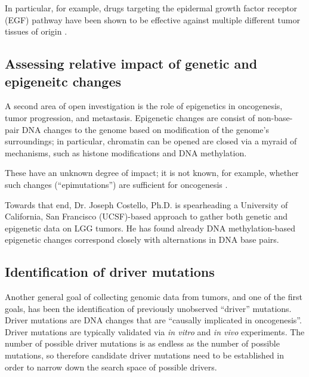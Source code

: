         In particular, for  example, drugs targeting the epidermal growth factor receptor
        (EGF) pathway have been shown to be effective against multiple
        different tumor tissues of origin
        \cite{barretina_cancer_2012}.


        \subsection{Assessing relative impact of genetic and
          epigeneitc changes}

        A second area of open investigation is the role of epigenetics
        in oncogenesis, tumor progression, and
        metastasis. Epigenetic changes are consist of non-base-pair
        DNA changes to the genome based on modification of the
        genome's surroundings; in particular, chromatin can be opened
        are closed via a myraid of mechanisms, such as histone
       modifications and DNA methylation\cite{kouzarides_chromatin_2007}.

        These have an unknown degree of impact;
        it is not known, for example, whether such changes
        (``epimutations'') are sufficient for oncogenesis
        \cite{nagarajan_recurrent_2014} \cite{feinberg_epigenetic_2006}. 

        Towards that end, Dr. Joseph Costello, Ph.D. is spearheading a
        University of California, San Francisco (UCSF)-based approach to
        gather both genetic and epigenetic data on LGG tumors. He has
        found already DNA methylation-based epigenetic changes
        correspond closely with alternations in DNA base
        pairs\cite{johnson_mutational_2014}. 

        \subsection{Identification of driver mutations}

        Another general goal of collecting genomic data from tumors,
        and one of the first goals, has been the identification of
        previously unobserved  ``driver'' mutations. Driver mutations are DNA changes that
        are  ``causally implicated
        in oncogenesis''\cite{stratton_cancer_2009}. Driver mutations
        are typically validated via \textit{in vitro} and \textit{in vivo}
        experiments. The number of possible driver mutations is as
        endless as the number of possible mutations, so therefore
        candidate driver mutations need to be established in order to
        narrow down the search space of possible drivers. 

